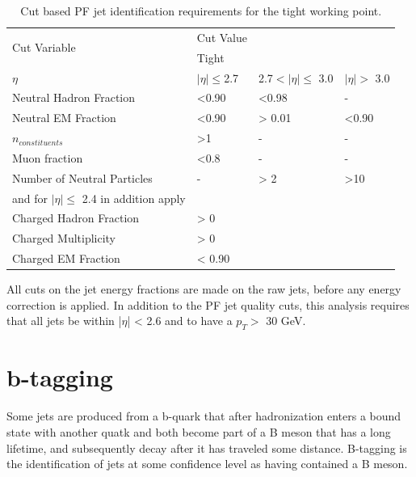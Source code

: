\begin{table}[htbp]
    \caption{Cut based PF jet identification requirements for the tight working point.}
    \centering
    \begin{tabular}{llll}
        \hline
        \multirow{2}{*}{Cut Variable}               & Cut Value \\\cline{2-2}
                                                    & Tight\\ 
        \hline 
        $\eta$& $|\eta|\leq$2.7 &2.7$<|\eta|\leq$ 3.0  & $|\eta|>$ 3.0\\
        \hline 
        Neutral Hadron Fraction  & <0.90  & <0.98 & -\\  
        Neutral EM Fraction      & <0.90  & > 0.01 & <0.90\\
        $n_{constituents}$       & >1     & -      & - \\
        Muon fraction            & <0.8   & -      & -\\
        Number of Neutral Particles & - & > 2      & >10\\
        \hline
        and for $|\eta| \leq$ 2.4 in addition apply\\
        \hline
        Charged Hadron Fraction & > 0 \\
        Charged Multiplicity    & > 0 \\
        Charged EM Fraction     & < 0.90\\
        \hline 
    \end{tabular}
    \label{tab:PFJetID}
\end{table}

All cuts on the jet energy fractions are made on the raw jets, before any energy correction is applied. In addition to the PF jet quality cuts, this analysis requires that all jets be within |$\eta$| < 2.6 and to have a $p_{T} > $ 30 GeV. 

\section{b-tagging}
Some jets are produced from a b-quark that after hadronization enters a bound state with another quatk and both become part of a B meson that has a long lifetime, and subsequently decay after it has traveled some distance. B-tagging is the identification of jets at some confidence level as having contained a B meson.

